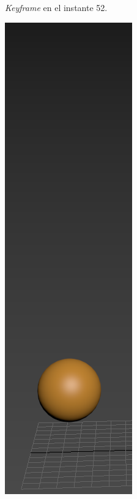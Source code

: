 \documentclass{article}
\begin{document}
\begin{figure}[H]
\begin{subfigure}[H]{0.15\textwidth}
	    \caption{\textit{Keyframe} en el instante 52.}
	\end{subfigure}
    \hfill
	\begin{subfigure}[H]{0.15\textwidth}
	    \centering
	    \includegraphics[width=\textwidth]{imagenes/Ejercicio 2/p1_55.png}

\end{subfigure}
\end{figure}
\end{document}
